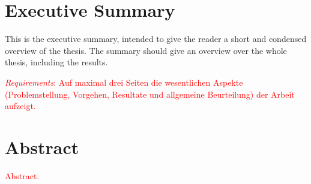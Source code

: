 \documentclass[11pt,a4paper]{article}
\begin{document}







\section*{Executive Summary}

\begin{doublespacing}

This is the executive summary, intended to give the reader a short and condensed overview of the thesis. The summary should give an overview over the whole thesis, including the results.

\textcolor{red}{\textit{Requirements}: Auf maximal drei Seiten die wesentlichen Aspekte (Problemstellung, Vorgehen, Resultate und allgemeine Beurteilung) der Arbeit aufzeigt.}

\end{doublespacing}







\newpage
\section*{Abstract}

\begin{doublespacing}

\textcolor{red}{Abstract.}

\end{doublespacing}







\newpage
\tableofcontents

\newpage

\listoffigures
\vspace{10mm}
\listoftables


\newpage
{}
\setlength{\parskip}{0.4cm} 
\end{document}
